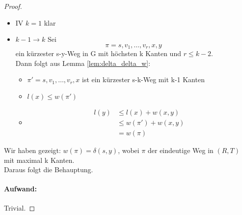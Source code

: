 \begin{proof}
\begin{itemize}[label=$\lozenge$, itemsep=2ex]
	\item IV \underline{$k=1$} klar
	\item \underline{$k-1 \to k$} Sei 
		\[
		\pi=s,v_1,\ldots,v_r,x,y
		\]
	ein kürzester s-y-Weg in G mit höchsten k Kanten und $r\le k-2$. \\
	Dann folgt aus Lemma \ref{lem:delta_delta_w}:
	\begin{itemize}
		\item $\pi'=s,v_1,\ldots,v_r,x$ ist ein kürzester s-k-Weg mit k-1 Kanten
		\item $l(x)\le w(\pi')$
		\item \begin{align*}
				l(y)&\le l(x)+w(x,y) \\
				    &\le w(\pi') + w(x,y) \\
				    &= w(\pi)
		\end{align*}
	\end{itemize}
\end{itemize}
Wir haben gezeigt: $w(\pi) = \delta(s,y)$, wobei $\pi$ der eindeutige Weg in $(R,T)$ mit maximal k Kanten. \\
Daraus folgt die Behauptung.
\paragraph{Aufwand:} Trivial.
\end{proof}

